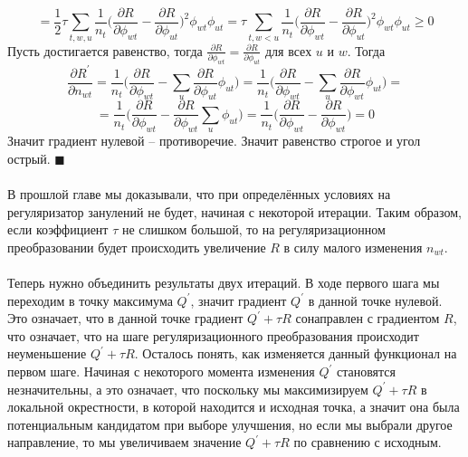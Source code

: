 \documentclass[12pt]{article}
\newenvironment{Proof} 
	{\par\noindent{\bf Доказательство.}} 
	{\hfill$\blacksquare$}
\renewcommand{\geq}{\geqslant}
\begin{document}
\begin{Proof}
\[\]
\[
= \frac12 \tau \sum\limits_{t, w, u}  \frac{1}{n_{t}} \bigg(  \frac{\partial{R}}{\partial{\phi_{wt}}}  -  \frac{\partial{R}}{\partial{\phi_{ut}}}  \bigg)^2 \phi_{wt} \phi_{ut} = \tau \sum\limits_{t, w < u}  \frac{1}{n_{t}} \bigg(  \frac{\partial{R}}{\partial{\phi_{wt}}}  -  \frac{\partial{R}}{\partial{\phi_{ut}}}  \bigg)^2 \phi_{wt} \phi_{ut} \geq 0
\]
Пусть достигается равенство, тогда $\frac{\partial{R}}{\partial{\phi_{wt}}}  =  \frac{\partial{R}}{\partial{\phi_{ut}}}$ для всех $u$ и $w$. Тогда
\[
\frac{\partial{R^{\prime}}}{\partial{n_{wt}}} = \frac{1}{n_t} \bigg( \frac{\partial{R}}{\partial{\phi_{wt}}} - \sum_{u}  \frac{\partial{R}}{\partial{\phi_{ut}}} \phi_{ut} \bigg) = \frac{1}{n_t} \bigg( \frac{\partial{R}}{\partial{\phi_{wt}}} - \sum_{u}  \frac{\partial{R}}{\partial{\phi_{wt}}} \phi_{ut} \bigg) =
\]
\[
=\frac{1}{n_t} \bigg( \frac{\partial{R}}{\partial{\phi_{wt}}} - \frac{\partial{R}}{\partial{\phi_{wt}}} \sum_{u} \phi_{ut} \bigg)  = \frac{1}{n_t} \bigg( \frac{\partial{R}}{\partial{\phi_{wt}}} - \frac{\partial{R}}{\partial{\phi_{wt}}} \bigg) = 0
\]
Значит градиент нулевой -- противоречие. Значит равенство строгое и угол острый.
\end{Proof}\ \\
\ \\
В прошлой главе мы доказывали, что при определённых условиях на регуляризатор занулений не будет, начиная с некоторой итерации. Таким образом, если коэффициент $\tau$ не слишком большой, то на регуляризационном преобразовании будет происходить увеличение $R$ в силу малого изменения $n_{wt}$.\\
\ \\
Теперь нужно объединить результаты двух итераций. В ходе первого шага мы переходим в точку максимума $Q^{\prime}$, значит градиент $Q^{\prime}$ в данной точке нулевой. Это означает, что в данной точке градиент $Q^{\prime} + \tau R$ сонаправлен с градиентом $R$, что означает, что на шаге регуляризационного преобразования происходит неуменьшение $Q^{\prime} + \tau R$. Осталось понять, как изменяется данный функционал на первом шаге. Начиная с некоторого момента изменения $Q^{\prime}$ становятся незначительны, а это означает, что поскольку мы максимизируем $Q^{\prime} + \tau R$ в локальной окрестности, в которой находится и исходная точка, а значит она была потенциальным кандидатом при выборе улучшения, но если мы выбрали другое направление, то мы увеличиваем значение $Q^{\prime} + \tau R$ по сравнению с исходным.\\
\end{document}
